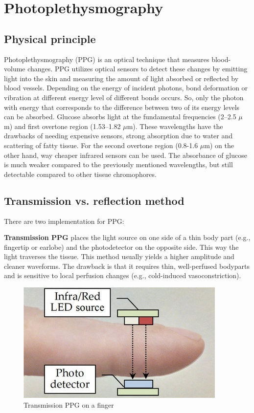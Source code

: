 
\chapter{Photoplethysmography}
\label{cha:Photoplethysmography}

\section{Physical principle}
\label{sec:Physical principle}
Photoplethysmography (PPG) is an optical technique that measures blood-volume changes.
PPG utilizes optical sensors to detect these changes by emitting light into the skin and measuring the amount of light absorbed or reflected by blood vessels.
Depending on the energy of incident photons, bond deformation or vibration at different energy level of different bonds occurs. So, only the photon with energy 
that corresponds to the difference between two of its energy levels can be absorbed.\cite{azudin_principles_2023, castaneda_review_2018}
Glucose absorbs light at the fundamental frequencies (2–2.5 $ \mu $m) and first overtone region (1.53–1.82 $ \mu $m). These wavelengths have the drawbacks of needing 
expensive sensors, strong absorption due to water and scattering of fatty tissue. For the second overtone region (0.8-1.6 $ \mu $m) on the other hand, way cheaper 
infrared sensors can be used. The absorbance of glucose is much weaker compared to the previously mentioned wavelengths, but still detectable compared to other 
tissue chromophores. \cite{hossain_estimation_2019}

\section{Transmission vs. reflection method}
\label{sec:Transmission vs. reflection method}
There are two implementation for PPG:

\textbf{Transmission PPG} places the light source on one side of a thin body part (e.g., fingertip or earlobe) and the photodetector on the opposite side. This way the light traverses the tissue. This method usually yields a higher amplitude and cleaner waveforms. The drawback is that it requires thin, well-perfused bodyparts and is sensitive to local perfusion changes (e.g., cold-induced vasoconstriction).\cite{castaneda_review_2018}
\begin{figure}[H]
    \centering
    \includegraphics[scale=0.5]{Figures/Transmission_ppg.jpg}
    \caption{Transmission PPG on a finger}
    \label{fig:transmission_ppg}
\end{figure}


